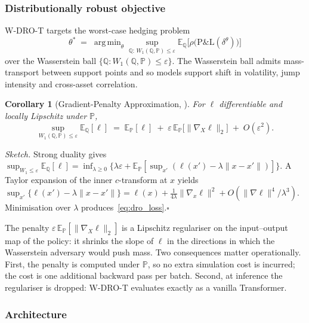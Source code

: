 \documentclass[10pt,letterpaper]{article}
\newcommand{\E}{\mathbb{E}}
\newcommand{\PP}{\mathbb{P}}
\newcommand{\QQ}{\mathbb{Q}}
\newcommand{\argmin}{\mathop{\mathrm{arg\,min}}}
\newcommand{\Wone}{W_{1}}
\newtheorem{corollary}{Corollary}
\begin{document}
\subsubsection*{Distributionally robust objective}

W-DRO-T targets the worst-case hedging problem
\begin{equation}
\theta^* \;=\; \argmin_\theta \sup_{\QQ:\,\Wone(\QQ,\PP)\le\varepsilon}
\E_\QQ\!\bigl[\rho\bigl(\mathrm{P\&L}(\delta^\theta)\bigr)\bigr]
\label{eq:dro_obj}
\end{equation}
over the Wasserstein ball
$\{\QQ:\Wone(\QQ,\PP)\le\varepsilon\}$. The Wasserstein ball admits
mass-transport between support points and so models support shift in
volatility, jump intensity and cross-asset correlation.

\begin{corollary}[Gradient-Penalty Approximation,
\citealp{blanchet2019quantifying}]\label{cor:grad_penalty}
For $\ell$ differentiable and locally Lipschitz under $\PP$,
\begin{equation}
\sup_{\Wone(\QQ,\PP)\le\varepsilon}\E_\QQ[\ell]
\;=\; \E_\PP[\ell] \;+\; \varepsilon\,\E_\PP\!\bigl[\|\nabla_X\ell\|_2\bigr]
\;+\; O(\varepsilon^2).
\label{eq:dro_loss}
\end{equation}
\end{corollary}

\noindent\textit{Sketch.}
Strong duality gives
$\sup_{\Wone\le\varepsilon}\E_\QQ[\ell]
=\inf_{\lambda\ge 0}\bigl\{\lambda\varepsilon
+ \E_\PP[\sup_{x'}(\ell(x')-\lambda\|x-x'\|)]\bigr\}$.
A Taylor expansion of the inner $c$-transform at $x$ yields
$\sup_{x'}\{\ell(x')-\lambda\|x-x'\|\}
= \ell(x)+\tfrac{1}{4\lambda}\|\nabla_x\ell\|^2
+ O(\|\nabla\ell\|^4/\lambda^3)$.
Minimisation over $\lambda$ produces~\eqref{eq:dro_loss}.\hfill$\square$

The penalty $\varepsilon\,\E_\PP[\|\nabla_X\ell\|_2]$ is a Lipschitz
regulariser on the input--output map of the policy: it shrinks the
slope of $\ell$ in the directions in which the Wasserstein adversary
would push mass. Two consequences matter operationally. First, the
penalty is computed under $\PP$, so no extra simulation cost is
incurred; the cost is one additional backward pass per batch.
Second, at inference the regulariser is dropped: W-DRO-T evaluates
exactly as a vanilla Transformer.

\subsubsection*{Architecture}
\end{document}
